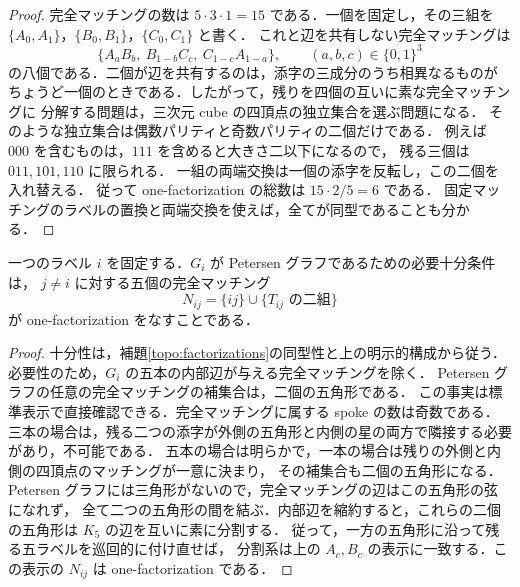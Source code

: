 \begin{proof}
完全マッチングの数は $5\cdot3\cdot1=15$ である．一個を固定し，その三組を
$\{A_0,A_1\}$，$\{B_0,B_1\}$，$\{C_0,C_1\}$ と書く．
これと辺を共有しない完全マッチングは
\[
 \{A_aB_b,\ B_{1-b}C_c,\ C_{1-c}A_{1-a}\},
 \qquad(a,b,c)\in\{0,1\}^3
\]
の八個である．二個が辺を共有するのは，添字の三成分のうち相異なるものが
ちょうど一個のときである．したがって，残りを四個の互いに素な完全マッチングに
分解する問題は，三次元 cube の四頂点の独立集合を選ぶ問題になる．
そのような独立集合は偶数パリティと奇数パリティの二個だけである．
例えば $000$ を含むものは，$111$ を含めると大きさ二以下になるので，
残る三個は $011,101,110$ に限られる．
一組の両端交換は一個の添字を反転し，この二個を入れ替える．
従って one-factorization の総数は $15\cdot2/5=6$ である．
固定マッチングのラベルの置換と両端交換を使えば，全てが同型であることも分かる．
\end{proof}

\begin{lemma}\label{topo:local-petersen}
一つのラベル $i$ を固定する．$G_i$ が Petersen グラフであるための必要十分条件は，
$j\ne i$ に対する五個の完全マッチング
\[
 N_{ij}=\{ij\}\cup\{T_{ij}\text{ の二組}\}
\]
が one-factorization をなすことである．
\end{lemma}

\begin{proof}
十分性は，補題\ref{topo:factorizations}の同型性と上の明示的構成から従う．
必要性のため，$G_i$ の五本の内部辺が与える完全マッチングを除く．
Petersen グラフの任意の完全マッチングの補集合は，二個の五角形である．
この事実は標準表示で直接確認できる．完全マッチングに属する spoke の数は奇数である．
三本の場合は，残る二つの添字が外側の五角形と内側の星の両方で隣接する必要があり，不可能である．
五本の場合は明らかで，一本の場合は残りの外側と内側の四頂点のマッチングが一意に決まり，
その補集合も二個の五角形になる．
Petersen グラフには三角形がないので，完全マッチングの辺はこの五角形の弦になれず，
全て二つの五角形の間を結ぶ．内部辺を縮約すると，これらの二個の五角形は
$K_5$ の辺を互いに素に分割する．
従って，一方の五角形に沿って残る五ラベルを巡回的に付け直せば，
分割系は上の $A_c,B_c$ の表示に一致する．この表示の $N_{ij}$ は
one-factorization である．
\end{proof}

